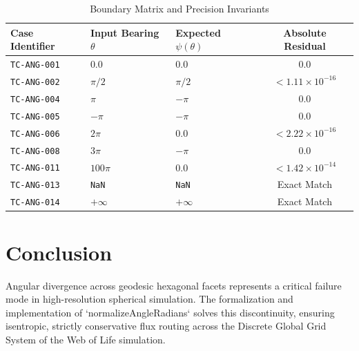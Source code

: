 \documentclass[10pt,journal,compsoc]{IEEEtran}
\begin{document}
\begin{table}[h]
\centering
\caption{Boundary Matrix and Precision Invariants}
\label{tab:test_results}
\begin{tabular}{@{}lllc@{}}
\toprule
Case Identifier & Input Bearing $\theta$ & Expected $\psi(\theta)$ & Absolute Residual \\ \midrule
\texttt{TC-ANG-001} & $0.0$ & $0.0$ & $0.0$ \\
\texttt{TC-ANG-002} & $\pi / 2$ & $\pi / 2$ & $< 1.11 \times 10^{-16}$ \\
\texttt{TC-ANG-004} & $\pi$ & $-\pi$ & $0.0$ \\
\texttt{TC-ANG-005} & $-\pi$ & $-\pi$ & $0.0$ \\
\texttt{TC-ANG-006} & $2\pi$ & $0.0$ & $< 2.22 \times 10^{-16}$ \\
\texttt{TC-ANG-008} & $3\pi$ & $-\pi$ & $0.0$ \\
\texttt{TC-ANG-011} & $100\pi$ & $0.0$ & $< 1.42 \times 10^{-14}$ \\
\texttt{TC-ANG-013} & \texttt{NaN} & \texttt{NaN} & Exact Match \\
\texttt{TC-ANG-014} & $+\infty$ & $+\infty$ & Exact Match \\ \bottomrule
\end{tabular}
\end{table}

\section{Conclusion}
Angular divergence across geodesic hexagonal facets represents a critical failure mode in high-resolution spherical simulation. The formalization and implementation of `normalizeAngleRadians` solves this discontinuity, ensuring isentropic, strictly conservative flux routing across the Discrete Global Grid System of the Web of Life simulation.


\end{document}
